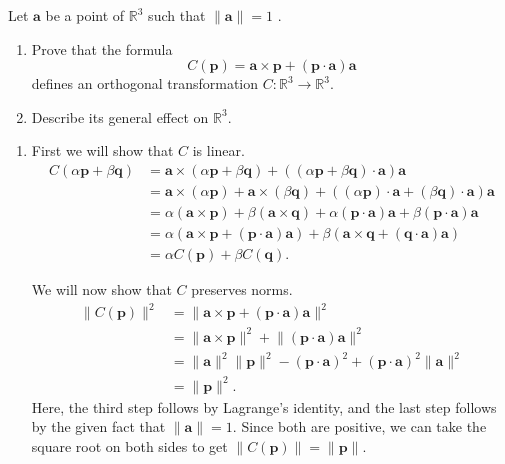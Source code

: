 \documentclass[12 pt, letterpaper]{hmcpset}
\begin{document}
\pagebreak

\begin{problem}[Problem 3.]
	Let $\mathbf{a}$  be a point of $\mathbb{R}^{3}$  such that $\lVert \mathbf{a} \rVert = 1$ .
	\begin{enumerate}
		\item Prove that the formula
			\[
				C(\mathbf{p}) = \mathbf{a} \times \mathbf{p} + (\mathbf{p} \cdot \mathbf{a}) \mathbf{a}
			\]
			defines an orthogonal transformation $C : \mathbb{R}^{3} \to \mathbb{R}^{3}$.
		\item Describe its general effect on $\mathbb{R}^{3}$.
	\end{enumerate}
\end{problem}

\begin{solution}
	\begin{enumerate}
		\item First we will show that $C$ is linear.
			\[
				\begin{split}
					C(\alpha \mathbf{p} + \beta \mathbf{q}) & = \mathbf{a} \times (\alpha \mathbf{p} + \beta \mathbf{q}) + ((\alpha \mathbf{p} + \beta \mathbf{q}) \cdot \mathbf{a}) \mathbf{a} \\
								   & = \mathbf{a} \times (\alpha \mathbf{p}) + \mathbf{a} \times (\beta \mathbf{q}) + ((\alpha \mathbf{p}) \cdot \mathbf{a} +  (\beta \mathbf{q}) \cdot \mathbf{a}) \mathbf{a} \\
								   & = \alpha(\mathbf{a} \times \mathbf{p}) + \beta (\mathbf{a} \times \mathbf{q}) + \alpha(\mathbf{p} \cdot \mathbf{a}) \mathbf{a} + \beta (\mathbf{p} \cdot \mathbf{a}) \mathbf{a} \\
								   & = \alpha(\mathbf{a} \times \mathbf{p} + (\mathbf{p} \cdot \mathbf{a}) \mathbf{a}) + \beta (\mathbf{a} \times \mathbf{q} + (\mathbf{q} \cdot \mathbf{a}) \mathbf{a}) \\
								   & = \alpha C(\mathbf{p}) + \beta C(\mathbf{q}).
				\end{split}
			\] 

			We will now show that $C$ preserves norms.
			\[
				\begin{split}
					\lVert C(\mathbf{p}) \rVert^{2} & = \lVert \mathbf{a} \times \mathbf{p} + (\mathbf{p} \cdot \mathbf{a}) \mathbf{a} \rVert^{2} \\
									& = \lVert \mathbf{a} \times \mathbf{p} \rVert^{2} + \lVert (\mathbf{p} \cdot \mathbf{a}) \mathbf{a} \rVert^{2} \\
									& = \lVert \mathbf{a} \rVert^{2} \lVert \mathbf{p} \rVert^{2} - (\mathbf{p} \cdot \mathbf{a})^{2} + (\mathbf{p} \cdot \mathbf{a})^{2} \lVert \mathbf{a} \rVert^{2} \\
									& = \lVert \mathbf{p} \rVert^{2}.
				\end{split}
			\]
			Here, the third step follows by Lagrange's identity, and the last step follows by the given fact that $\lVert \mathbf{a} \rVert = 1$. Since both are positive, we can take the square root on both sides to get $\lVert C(\mathbf{p}) \rVert = \lVert \mathbf{p} \rVert$. 


\end{enumerate}
\end{solution}
\end{document}
